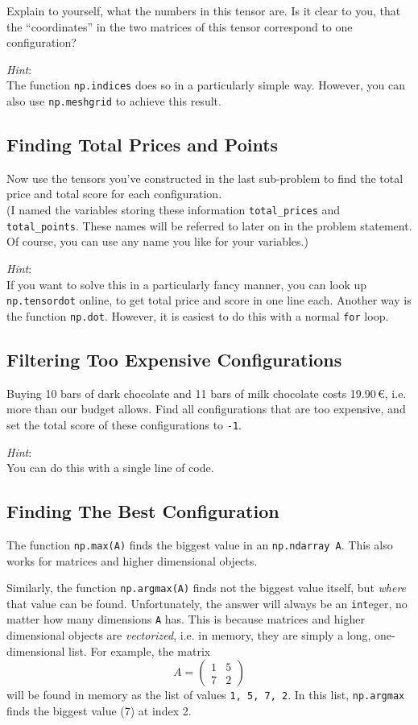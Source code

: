 \documentclass[
	english,
	fontsize=10pt,
	parskip=half,
	titlepage=true,
	DIV=12
]{scrartcl}
\newcommand*{\inPy}[1]{\texttt{#1}}
\newcommand*{\ie}{i.\;e. }
\begin{document}
Explain to yourself, what the numbers in this tensor are. Is it clear to you, that the \enquote{coordinates} in the two matrices of this tensor correspond to one configuration?

\emph{Hint}:\\
The function \texttt{np.indices} does so in a particularly simple way. However, you can also use \texttt{np.meshgrid} to achieve this result.


\subsection*{Finding Total Prices and Points}
Now use the tensors you've constructed in the last sub-problem to find the total price and total score for each configuration.\\
(I named the variables storing these information \texttt{total\_prices} and \texttt{total\_points}. These names will be referred to later on in the problem statement. Of course, you can use any name you like for your variables.)

\emph{Hint}:\\
If you want to solve this in a particularly fancy manner, you can look up \texttt{np.tensordot} online, to get total price and score in one line each. Another way is the function \texttt{np.dot}. However, it is easiest to do this with a normal \texttt{for} loop.


\subsection*{Filtering Too Expensive Configurations}
Buying 10 bars of dark chocolate and 11 bars of milk chocolate costs 19.90\,€, \ie more than our budget allows. Find all configurations that are too expensive, and set the total score of these configurations to \texttt{-1}.

\emph{Hint}:\\
You can do this with a single line of code.


\subsection*{Finding The Best Configuration}
The function \texttt{np.max(A)} finds the biggest value in an \texttt{np.ndarray A}. This also works for matrices and higher dimensional objects.

Similarly, the function \texttt{np.argmax(A)} finds not the biggest value itself, but \emph{where} that value can be found. Unfortunately, the answer will always be an \inPy{int}eger, no matter how many dimensions \texttt{A} has. This is because matrices and higher dimensional objects are \emph{vectorized}, \ie in memory, they are simply a long, one-dimensional list. For example, the matrix
\[ A = \begin{pmatrix}
	1 & 5 \\
	7 & 2
\end{pmatrix} \]
will be found in memory as the list of values \texttt{1, 5, 7, 2}. In this list, \texttt{np.argmax} finds the biggest value (7) at index 2.
\end{document}
